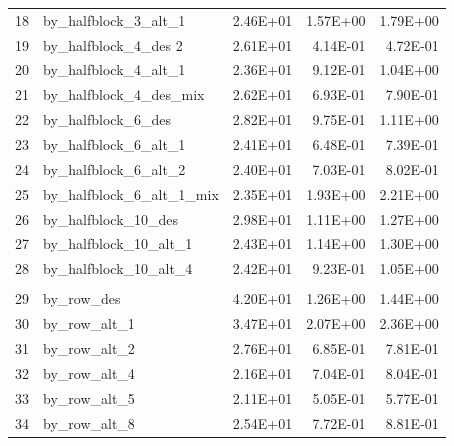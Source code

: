 \documentclass[11pt]{article}
\begin{document}
\begin{table}[htbp]
\begin{tabular}{rlrrr}
    18    & by\_halfblock\_3\_alt\_1 & 2.46E+01 & 1.57E+00 & 1.79E+00 \\
    19    & by\_halfblock\_4\_des 2 & 2.61E+01 & 4.14E-01 & 4.72E-01 \\
    20    & by\_halfblock\_4\_alt\_1 & 2.36E+01 & 9.12E-01 & 1.04E+00 \\
    21    & by\_halfblock\_4\_des\_mix & 2.62E+01 & 6.93E-01 & 7.90E-01 \\
    22    & by\_halfblock\_6\_des & 2.82E+01 & 9.75E-01 & 1.11E+00 \\
    23    & by\_halfblock\_6\_alt\_1 & 2.41E+01 & 6.48E-01 & 7.39E-01 \\
    24    & by\_halfblock\_6\_alt\_2 & 2.40E+01 & 7.03E-01 & 8.02E-01 \\
    25    & by\_halfblock\_6\_alt\_1\_mix & 2.35E+01 & 1.93E+00 & 2.21E+00 \\
    26    & by\_halfblock\_10\_des & 2.98E+01 & 1.11E+00 & 1.27E+00 \\
    27    & by\_halfblock\_10\_alt\_1 & 2.43E+01 & 1.14E+00 & 1.30E+00 \\
    28    & by\_halfblock\_10\_alt\_4 & 2.42E+01 & 9.23E-01 & 1.05E+00 \\
          &       &       &       &  \\
    29    & by\_row\_des & 4.20E+01 & 1.26E+00 & 1.44E+00 \\
    30    & by\_row\_alt\_1 & 3.47E+01 & 2.07E+00 & 2.36E+00 \\
    31    & by\_row\_alt\_2 & 2.76E+01 & 6.85E-01 & 7.81E-01 \\
    32    & by\_row\_alt\_4 & 2.16E+01 & 7.04E-01 & 8.04E-01 \\
    33    & by\_row\_alt\_5 & 2.11E+01 & 5.05E-01 & 5.77E-01 \\
    34    & by\_row\_alt\_8 & 2.54E+01 & 7.72E-01 & 8.81E-01 \\

\end{tabular}
\end{table}
\end{document}
